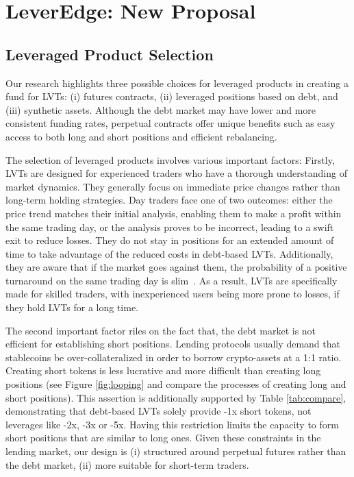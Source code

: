 
\section{LeverEdge: New Proposal}\label{sec:proposal}
\subsection{Leveraged Product Selection}\label{subsec:selection}
Our research highlights three possible choices for leveraged products in creating a fund for LVTs: (i) futures contracts, (ii) leveraged positions based on debt, and (iii) synthetic assets. Although the debt market may have lower and more consistent funding rates, perpetual contracts offer unique benefits such as easy access to both long and short positions and efficient rebalancing.

The selection of leveraged products involves various important factors: Firstly, LVTs are designed for experienced traders who have a thorough understanding of market dynamics. They generally focus on immediate price changes rather than long-term holding strategies. Day traders face one of two outcomes: either the price trend matches their initial analysis, enabling them to make a profit within the same trading day, or the analysis proves to be incorrect, leading to a swift exit to reduce losses. They do not stay in positions for an extended amount of time to take advantage of the reduced costs in debt-based LVTs. Additionally, they are aware that if the market goes against them, the probability of a positive turnaround on the same trading day is slim~\cite{fung2000intraday}. As a result, LVTs are specifically made for skilled traders, with inexperienced users being more prone to losses, if they hold LVTs for a long time. 

The second important factor riles on the fact that, the debt market is not efficient for establishing short positions. Lending protocols usually demand that stablecoins be over-collateralized in order to borrow crypto-assets at a 1:1 ratio. Creating short tokens is less lucrative and more difficult than creating long positions (see Figure \ref{fig:looping} and compare the processes of creating long and short positions). This assertion is additionally supported by Table \ref{tab:compare}, demonstrating that debt-based LVTs solely provide -1x short tokens, not leverages like -2x, -3x or -5x. Having this restriction limits the capacity to form short positions that are similar to long ones. Given these constraints in the lending market, our design is (i) structured around perpetual futures rather than the debt market, (ii) more suitable for short-term traders.

